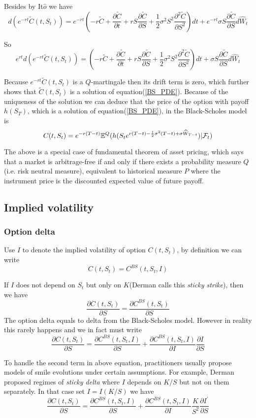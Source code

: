 \documentclass[10pt]{article}
\theoremstyle{plain}
\numberwithin{equation}{section}
\numberwithin{table}{section}
\newcommand{\s}{\sigma}
\newcommand{\prt}[1]{\left( #1 \right)}  %
\newcommand{\pa}{\partial}
\newcommand{\E}{\mathbb{E}}
\begin{document}
Besides by It$\hat{o}$ we have 
\[
    d(e^{-rt}\tilde C(t,S_t)) = e^{-rt} \prt{-r \tilde C+\frac{\pa \tilde C}{\pa t}+rS\frac{\pa \tilde C}{\pa S}+\frac{1}{2}\s^2 S^2 \frac{\pa^2 \tilde C}{\pa S^2}}dt + e^{-rt} \s S\frac{\pa \tilde C}{\pa S} d \widehat{W}_t
\]

So 
\[
    e^{rt}d\prt{e^{-rt}\tilde C(t,S_t)} =  \prt{-r \tilde C+\frac{\pa \tilde C}{\pa t}+rS\frac{\pa \tilde C}{\pa S}+\frac{1}{2}\s^2 S^2 \frac{\pa^2 \tilde C}{\pa S^2}}dt + \s S\frac{\pa \tilde C}{\pa S} d \widehat{W}_t   
\]

Because $e^{-rt} \tilde{C}(t,S_t)$ is a $Q$-martingale then its drift term is zero, which further shows that $\tilde C(t,S_t)$ is a solution of equation(\ref{BS_PDE}). Because of the uniqueness of the solution we can deduce that 
the price of the option with payoff $h(S_T)$, which is a solution of equation(\ref{BS_PDE}),  in the Black-Scholes model is 
\[
    C(t,S_t) = e^{-r(T-t)}\E^Q(h(S_t e^{r(T-t)-\frac{1}{2}\s^2 (T-t)+\s \widehat{W}_{T-t}})|{\cal{F}}_t)    
\]


The above is a special case of fundamental theorem of asset pricing, which says that a market is arbitrage-free if and only if there exists a probability measure $Q$(i.e. risk neutral measure), equivalent to historical measure $P$ where the instrument price 
is the discounted expected value of future payoff.  


\subsection{Implied volatility}
\subsubsection{Option delta}
Use $I$ to denote the implied volatility of option $C(t,S_t)$, by definition we can write
\[
    C(t,S_t) = C^{BS}(t, S_t, I)    
\]

If $I$ does not depend on $S_t$ but only on $K$(Derman calls this \emph{sticky strike}), then we have
\[
   \frac{\pa C(t,S_t)}{\pa S}  =  \frac{\pa C^{BS}(t,S_t)}{\pa S}    
\]
The option delta equals to delta from the Black-Scholes model. However in reality this rarely happens and we in fact
must write
\[
    \frac{\pa C(t,S_t)}{\pa S}  =  \frac{\pa C^{BS}(t,S_t, I)}{\pa S}  + \frac{\pa C^{BS}(t,S_t,I)}{\pa I}\frac{\pa I}{\pa S} 
\]

To handle the second term in above equation, practitioners usually propose models of smile evolutions under certain 
assumptions. For example, Derman proposed regimes of \emph{sticky delta} where $I$ depends on $K/S$ but not on them separately. In that
case set $I=I(K/S)$ we have 
\[
    \frac{\pa C(t,S_t)}{\pa S}  =  \frac{\pa C^{BS}(t,S_t, I)}{\pa S} + \frac{\pa C^{BS}(t,S_t,I)}{\pa I} \frac{K}{S^2} \frac{\pa I^{'}}{\pa S} 
\]
\end{document}
